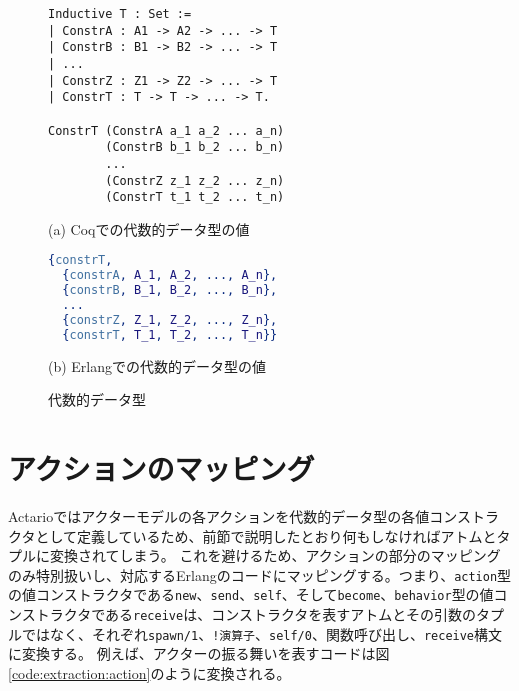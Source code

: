\begin{figure}\centering
\begin{minipage}{1\textwidth}\centering
\begin{lstlisting}[frame=single,numbers=none,xleftmargin=0pt]
Inductive T : Set :=
| ConstrA : A1 -> A2 -> ... -> T
| ConstrB : B1 -> B2 -> ... -> T
| ...
| ConstrZ : Z1 -> Z2 -> ... -> T
| ConstrT : T -> T -> ... -> T.

ConstrT (ConstrA a_1 a_2 ... a_n)
        (ConstrB b_1 b_2 ... b_n)
        ...
        (ConstrZ z_1 z_2 ... z_n)
        (ConstrT t_1 t_2 ... t_n)
\end{lstlisting}
(a) Coqでの代数的データ型の値
\end{minipage}
\begin{minipage}{1\textwidth}\centering
\begin{lstlisting}[frame=single,numbers=none,xleftmargin=0pt,language=Erlang]
{constrT,
  {constrA, A_1, A_2, ..., A_n},
  {constrB, B_1, B_2, ..., B_n},
  ...
  {constrZ, Z_1, Z_2, ..., Z_n},
  {constrT, T_1, T_2, ..., T_n}}
\end{lstlisting}
(b) Erlangでの代数的データ型の値
\end{minipage}
\label{code:extraction:adt}
\caption{代数的データ型}
\end{figure}

\section{アクションのマッピング}

Actarioではアクターモデルの各アクションを代数的データ型の各値コンストラクタとして定義しているため、前節で説明したとおり何もしなければアトムとタプルに変換されてしまう。
これを避けるため、アクションの部分のマッピングのみ特別扱いし、対応するErlangのコードにマッピングする。つまり、\lstinline{action}型の値コンストラクタである\lstinline{new}、\lstinline{send}、\lstinline{self}、そして\lstinline{become}、\lstinline{behavior}型の値コンストラクタである\lstinline{receive}は、コンストラクタを表すアトムとその引数のタプルではなく、それぞれ\lstinline{spawn/1}、\lstinline{!演算子}、\lstinline{self/0}、関数呼び出し、\lstinline{receive}構文に変換する。
例えば、アクターの振る舞いを表すコードは図\ref{code:extraction:action}のように変換される。

